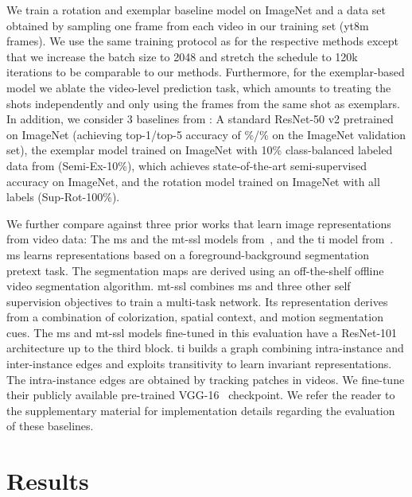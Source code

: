 \documentclass[10pt,twocolumn,letterpaper]{article}
\renewcommand{\paragraph}[1]{\noindent{\bf #1}\quad}
\begin{document}
{\paragraph{Baselines} We train a rotation and exemplar baseline model on ImageNet and a data set obtained by sampling one frame from each video in our training set (\gls{yt8m} frames). We use the same training protocol as \cite{kolesnikov2019revisiting} for the respective methods except that we increase the batch size to 2048 and stretch the schedule to 120k iterations to be comparable to our methods. Furthermore, for the exemplar-based model we ablate the video-level prediction task, which amounts to treating the shots independently and only using the frames from the same shot as exemplars. In addition, we consider 3 baselines from \cite{zhai2019visual}: A standard ResNet-50 v2 pretrained on ImageNet (achieving top-1/top-5 accuracy of \%/\% on the ImageNet validation set), the exemplar model trained on ImageNet with 10\% class-balanced labeled data from \cite{zhai2019s4l} (Semi-Ex-10\%), which achieves state-of-the-art semi-supervised accuracy on ImageNet, and the rotation model trained on ImageNet with all labels \cite{zhai2019s4l} (Sup-Rot-100\%).

We further compare against three prior works that learn image representations from video data: The \gls{ms} \cite{pathak2017learning} and the \gls{mt-ssl} models from~\cite{doersch2017multi}, and the \gls{ti} model from~\cite{wang2017transitive}. \gls{ms} learns representations based on a foreground-background segmentation pretext task. The segmentation maps are derived using an off-the-shelf offline video segmentation algorithm. \gls{mt-ssl} combines \gls{ms} and three other self supervision objectives to train a multi-task network.
Its representation derives from a combination of colorization, spatial context, and motion segmentation cues.
The \gls{ms} and \gls{mt-ssl} models fine-tuned in this evaluation have a ResNet-101~\cite{he2016deep} architecture up to the third block.
\gls{ti} builds a graph combining intra-instance and inter-instance edges and exploits transitivity to learn invariant representations. The intra-instance edges are obtained by tracking patches in videos.
We fine-tune their publicly available pre-trained VGG-16~\cite{simonyan2014very} checkpoint.
We refer the reader to the supplementary material for implementation details regarding the evaluation of these baselines.

\section{Results}

}
\end{document}
